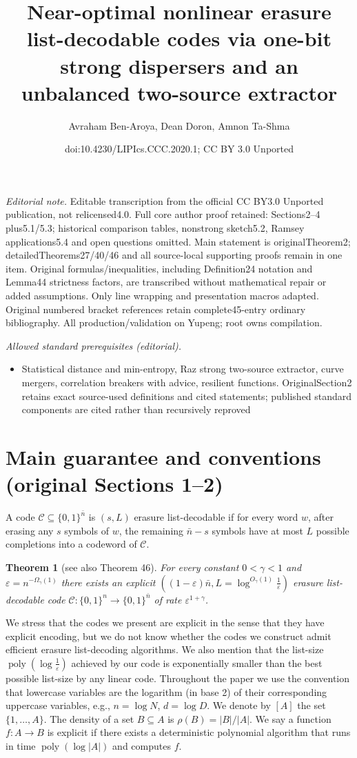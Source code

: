 \documentclass[10pt,a4paper]{article}
\title{Near-optimal nonlinear erasure list-decodable codes via one-bit strong dispersers and an unbalanced two-source extractor}
\author{Avraham Ben-Aroya, Dean Doron, Amnon Ta-Shma}
\date{doi:10.4230/LIPIcs.CCC.2020.1; CC BY 3.0 Unported}
\newtheorem{theorem}{Theorem}
\begin{document}
\maketitle
\noindent\textit{Editorial note.} Editable transcription from the official CC BY3.0 Unported publication, not relicensed4.0. Full core author proof retained: Sections2–4 plus5.1/5.3; historical comparison tables, nonstrong sketch5.2, Ramsey applications5.4 and open questions omitted. Main statement is originalTheorem2; detailedTheorems27/40/46 and all source-local supporting proofs remain in one item. Original formulas/inequalities, including Definition24 notation and Lemma44 strictness factors, are transcribed without mathematical repair or added assumptions. Only line wrapping and presentation macros adapted. Original numbered bracket references retain complete45-entry ordinary bibliography. All production/validation on Yupeng; root owns compilation.\par\medskip
\noindent\textit{Allowed standard prerequisites (editorial).}\begin{itemize}
\item Statistical distance and min-entropy, Raz strong two-source extractor, curve mergers, correlation breakers with advice, resilient functions. OriginalSection2 retains exact source-used definitions and cited statements; published standard components are cited rather than recursively reproved
\end{itemize}\medskip
\section*{Main guarantee and conventions (original Sections 1--2)}
A code $\mathcal C\subseteq\{0,1\}^{\bar n}$ is $(s,L)$ erasure list-decodable if for every word $w$, after erasing any $s$ symbols of $w$, the remaining $\bar n-s$ symbols have at most $L$ possible completions into a codeword of $\mathcal C$.
\setcounter{theorem}{1}

\begin{theorem}[see also Theorem 46]
For every constant $0<\gamma<1$ and $\varepsilon=n^{-\Omega_\gamma(1)}$ there exists an explicit $((1-\varepsilon)\bar n,L=\log^{O_\gamma(1)}\frac1\varepsilon)$ erasure list-decodable code $\mathcal C:\{0,1\}^n\to\{0,1\}^{\bar n}$ of rate $\varepsilon^{1+\gamma}$.
\end{theorem}

We stress that the codes we present are explicit in the sense that they have explicit encoding, but we do not know whether the codes we construct admit efficient erasure list-decoding algorithms. We also mention that the list-size $\operatorname{poly}(\log\frac1\varepsilon)$ achieved by our code is exponentially smaller than the best possible list-size by any linear code.
Throughout the paper we use the convention that lowercase variables are the logarithm (in base 2) of their corresponding uppercase variables, e.g., $n=\log N$, $d=\log D$. We denote by $[A]$ the set $\{1,\ldots,A\}$. The density of a set $B\subseteq A$ is $\rho(B)=|B|/|A|$. We say a function $f:A\to B$ is explicit if there exists a deterministic polynomial algorithm that runs in time $\operatorname{poly}(\log|A|)$ and computes $f$.
\end{document}
